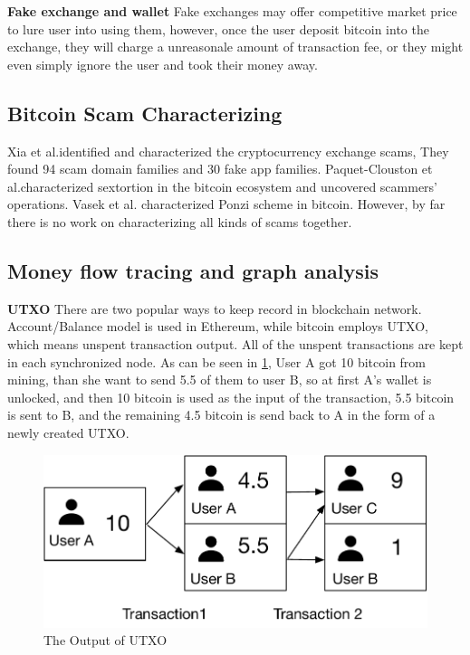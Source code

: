 \textbf{Fake exchange and wallet}
Fake exchanges may offer competitive market price to lure user into using them, however, once the user deposit bitcoin into the exchange, they will charge a unreasonale amount of transaction fee, or they might even simply ignore the user and took their money away.

\subsection{Bitcoin Scam Characterizing}
Xia et al.\cite{xia2020characterizing}identified and characterized the cryptocurrency exchange scams, They found 94 scam domain families and 30 fake app families. Paquet-Clouston et al.\cite{paquet2019spams}characterized sextortion in the bitcoin ecosystem and uncovered scammers' operations. Vasek et al.\cite{vasek2018analyzing} characterized Ponzi scheme in bitcoin. However, by far there is no work on characterizing all kinds of scams together.
\subsection{Money flow tracing and graph analysis}
\textbf{UTXO} 
There are two popular ways to keep record in blockchain network. Account/Balance model is used in Ethereum, while bitcoin employs UTXO, which means unspent transaction output. All of the unspent transactions are kept in each synchronized node.
As can be seen in \ref{fig:utxo}, User A got 10 bitcoin from mining, than she want to send 5.5 of them to user B, so at first A's wallet is unlocked, and then 10 bitcoin is used as the input of the transaction, 5.5 bitcoin is sent to B, and the remaining 4.5 bitcoin is send back to A in the form of a newly created UTXO.
\begin{figure}[tbp]
\centerline{\includegraphics[width=\columnwidth]{images/UTXO.pdf}}
\caption{The Output of UTXO}
\label{fig:utxo}
\end{figure}

